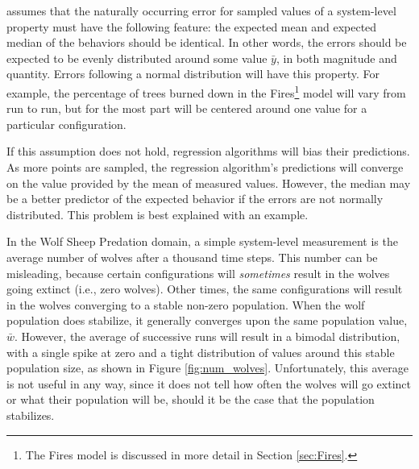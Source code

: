 \fw assumes that the naturally occurring error for sampled values of a system-level property must have the following feature: the expected mean and expected median of the behaviors should be identical.
In other words, the errors should be expected to be evenly distributed around some value $\bar y$, in  both magnitude and quantity.
Errors following a normal distribution will have this property.
For example, the percentage of trees burned down in the Fires\footnote{The Fires model is discussed in more detail in Section \ref{sec:Fires}.} model will vary from run to run, but for the most part will be centered around one value for a particular configuration.

If this assumption does not hold, regression algorithms will bias their predictions.
As more points are sampled, the regression algorithm's predictions will converge on the value provided by the mean of measured values.
However, the median may be a better predictor of the expected behavior if the errors are not normally distributed.
This problem is best explained with an example.


In the Wolf Sheep Predation domain, a simple system-level measurement is the average number of wolves after a thousand time steps.
This number can be misleading, because certain configurations will \textit{sometimes} result in the wolves going extinct (i.e., zero wolves).
Other times, the same configurations will result in the wolves converging to a stable non-zero population.
When the wolf population does stabilize, it generally converges upon the same population value, $\bar w$.
However, the average of successive runs will result in a bimodal distribution, with a single spike at zero and a tight distribution of values around this stable population size, as shown in Figure \ref{fig:num_wolves}.
Unfortunately, this average is not useful in any way, since it does not tell how often the wolves will go extinct or what their population will be, should it be the case that the population stabilizes.


